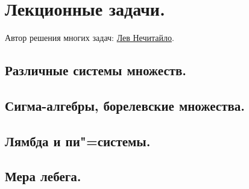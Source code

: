 \newpage
\section{Лекционные задачи.}
Автор решения многих задач: \href{https://vk.com/h0ho_haha}{Лев Нечитайло}.

\subsection{Различные системы множеств.}






\subsection{Сигма-алгебры, борелевские множества.}


\subsection{Лямбда и пи"=системы.}



\subsection{Мера лебега.}





